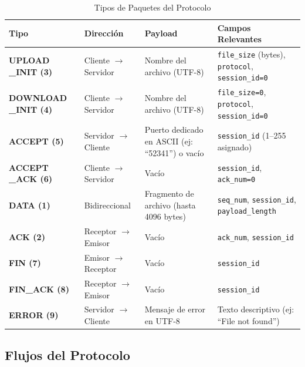 \begin{table}[H]

\label{tab:packet_types}
\renewcommand{\arraystretch}{1.2}
\begin{tabularx}{\textwidth}{|p{2.5cm}|p{3cm}|X|X|}
\hline
\textbf{Tipo} & \textbf{Dirección} & \textbf{Payload} & \textbf{Campos Relevantes} \\ \hline

\textbf{UPLOAD
\_INIT (3)}
& Cliente $\rightarrow$ Servidor
& Nombre del archivo (UTF-8)
& \texttt{file\_size} (bytes), \texttt{protocol}, \texttt{session\_id=0} \\ \hline

\textbf{DOWNLOAD
\_INIT (4)}
& Cliente $\rightarrow$ Servidor
& Nombre del archivo (UTF-8)
& \texttt{file\_size=0}, \texttt{protocol}, \texttt{session\_id=0} \\ \hline

\textbf{ACCEPT (5)}
& Servidor $\rightarrow$ Cliente
& Puerto dedicado en ASCII (ej: ``52341'') o vacío
& \texttt{session\_id} (1–255 asignado) \\ \hline

\textbf{ACCEPT
\_ACK (6)}
& Cliente $\rightarrow$ Servidor
& Vacío
& \texttt{session\_id}, \texttt{ack\_num=0} \\ \hline

\textbf{DATA (1)}
& Bidireccional
& Fragmento de archivo (hasta 4096 bytes)
& \texttt{seq\_num}, \texttt{session\_id}, \texttt{payload\_length} \\ \hline

\textbf{ACK (2)}
& Receptor $\rightarrow$ Emisor
& Vacío
& \texttt{ack\_num}, \texttt{session\_id} \\ \hline

\textbf{FIN (7)}
& Emisor $\rightarrow$ Receptor
& Vacío
& \texttt{session\_id} \\ \hline

\textbf{FIN\_ACK (8)}
& Receptor $\rightarrow$ Emisor
& Vacío
& \texttt{session\_id} \\ \hline

\textbf{ERROR (9)}
& Servidor $\rightarrow$ Cliente
& Mensaje de error en UTF-8
& Texto descriptivo (ej: ``File not found'') \\ \hline

\end{tabularx}
\centering
\caption{Tipos de Paquetes del Protocolo}
\end{table}

\subsection{Flujos del Protocolo}
